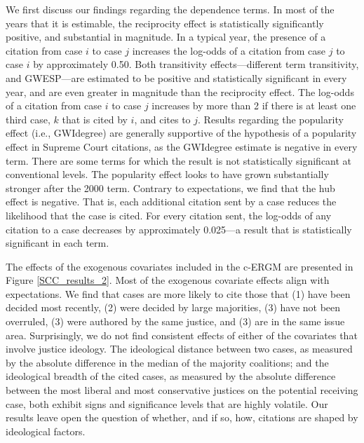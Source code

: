\documentclass[headsepline=true, abstracton]{scrartcl}
\begin{document}
We first discuss our findings regarding the dependence terms. In most of the years that it is estimable, the reciprocity effect is statistically significantly positive, and substantial in magnitude. In a typical year, the presence of a citation from case $i$ to case $j$ increases the log-odds of a citation from case $j$ to case $i$ by approximately 0.50. Both transitivity effects---different term transitivity, and GWESP---are estimated to be positive and statistically significant in every year, and are even greater in magnitude than the reciprocity effect. The log-odds of a citation from case $i$ to case $j$ increases by more than 2 if there is at least one third case, $k$ that is cited by $i$, and cites to $j$. Results regarding the popularity effect (i.e., GWIdegree) are generally supportive of the hypothesis of a popularity effect in Supreme Court citations, as the GWIdegree estimate is negative in every term. There are some terms for which the result is not statistically significant at conventional levels. The popularity effect looks to have grown substantially stronger after the 2000 term. Contrary to expectations, we find that the hub effect is negative. That is, each additional citation sent by a case reduces the likelihood that the case is cited. For every citation sent, the log-odds of any citation to a case decreases by approximately 0.025---a result that is statistically significant in each term.

The effects of the exogenous covariates included in the c-ERGM are presented in Figure \ref{SCC_results_2}.  Most of the exogenous covariate effects align with expectations. We find that cases are more likely to cite those that (1) have been decided most recently, (2) were decided by large majorities, (3) have not been overruled, (3) were authored by the same justice, and (3) are in the same issue area. Surprisingly, we do not find consistent effects of either of the covariates that involve justice ideology. The ideological distance between two cases, as measured by the absolute difference in the median of the majority coalitions; and the ideological breadth of the cited cases, as measured by the absolute difference between the most liberal and most conservative justices on the potential receiving case, both exhibit signs and significance levels that are highly volatile. Our results leave open the question of whether, and if so, how, citations are shaped by ideological factors.

\end{document}
